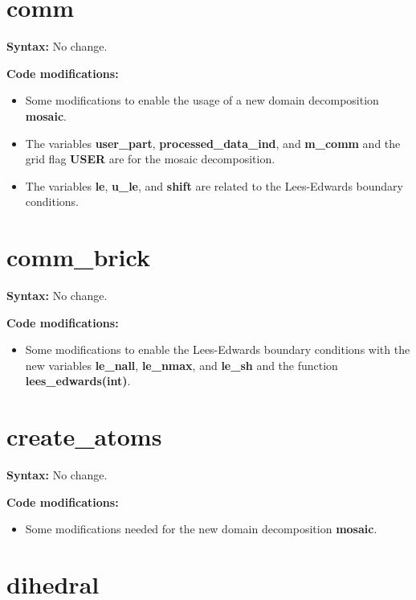 \section{comm}

{\bfseries Syntax:} No change.
\vspace{0.2cm}

{\bfseries Code modifications:}
\begin{itemize}
\item Some modifications to enable the usage of a new domain decomposition \textbf{mosaic}.  
\item The variables \textbf{user\_part}, \textbf{processed\_data\_ind}, and \textbf{m\_comm} and the grid flag \textbf{USER} are for the mosaic decomposition.
\item The variables \textbf{le}, \textbf{u\_le}, and \textbf{shift} are related to the Lees-Edwards boundary conditions.
\end{itemize}
  
\section{comm\_brick}

{\bfseries Syntax:} No change.
\vspace{0.2cm}

{\bfseries Code modifications:}
\begin{itemize}
\item Some modifications to enable the Lees-Edwards boundary conditions with the new variables \textbf{le\_nall}, \textbf{le\_nmax}, and \textbf{le\_sh} and
the function \textbf{lees\_edwards(int)}.
\end{itemize}

\section{create\_atoms}

{\bfseries Syntax:} No change.
\vspace{0.2cm}

{\bfseries Code modifications:}
\begin{itemize}
\item Some modifications needed for the new domain decomposition \textbf{mosaic}.
\end{itemize}  

\section{dihedral}

